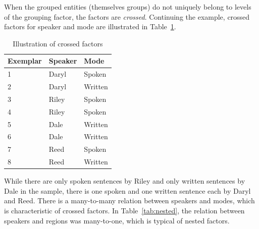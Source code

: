\documentclass[a4paper,12pt]{article}
\begin{document}
When the grouped entities (themselves groups) do not uniquely belong to levels of the grouping factor, the factors are \textit{crossed}.
Continuing the example, crossed factors for speaker and mode are illustrated in Table~\ref{tab:crossed}.
%
\begin{table}
  \centering
  \begin{tabular}{lll}
    \toprule
    \textbf{Exemplar} & \textbf{Speaker}  & \textbf{Mode}   \\
    \midrule
                    1 &           Daryl  &         Spoken  \\
                    2 &           Daryl  &         Written \\
                    3 &           Riley  &         Spoken  \\
                    4 &           Riley  &         Spoken  \\
                    5 &           Dale   &         Written \\
                    6 &           Dale   &         Written \\
                    7 &           Reed   &         Spoken  \\
                    8 &           Reed   &         Written \\
    \bottomrule
  \end{tabular}
  \caption{Illustration of crossed factors}
  \label{tab:crossed}
\end{table}
%
While there are only spoken sentences by Riley and only written sentences by Dale in the sample, there is one spoken and one written sentence each by Daryl and Reed.
There is a many-to-many relation between speakers and modes, which is characteristic of crossed factors.
In Table~\ref{tab:nested}, the relation between speakers and regions was many-to-one, which is typical of nested factors.
\end{document}
